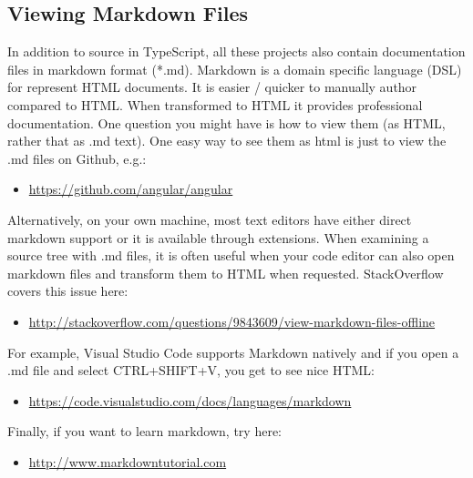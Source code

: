 \subsection{Viewing Markdown Files}

In addition to source in TypeScript, all these projects also contain documentation files
in markdown format (*.md). Markdown is a domain specific language (DSL) for
represent HTML documents. It is easier / quicker to manually author compared to
HTML. When transformed to HTML it provides professional documentation. One
question you might have is how to view them (as HTML, rather that as .md text). One
easy way to see them as html is just to view the .md files on Github, e.g.:

\begin{itemize}
  \item \url{https://github.com/angular/angular}
\end{itemize}

Alternatively, on your own machine, most text editors have either direct markdown
support or it is available through extensions. When examining a source tree with .md
files, it is often useful when your code editor can also open markdown files and
transform them to HTML when requested. StackOverflow covers this issue here:

\begin{itemize}
  \item \url{http://stackoverflow.com/questions/9843609/view-markdown-files-offline}
\end{itemize}

For example, Visual Studio Code supports Markdown natively and if you open a .md
file and select CTRL+SHIFT+V, you get to see nice HTML:

\begin{itemize}
  \item \url{https://code.visualstudio.com/docs/languages/markdown}
\end{itemize}

Finally, if you want to learn markdown, try here:

\begin{itemize}
  \item \url{http://www.markdowntutorial.com}
\end{itemize}
